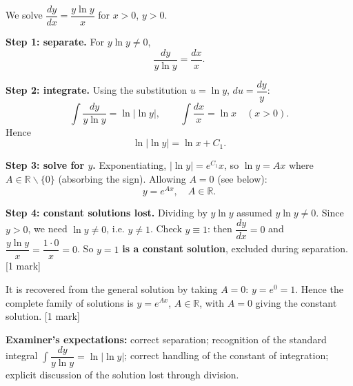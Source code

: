 \documentclass[11pt]{article}
\def\setminus{\mathbin{\backslash}}\let\smallsetminus\setminus
\begin{document}
\begin{corrige}
We solve $\dfrac{dy}{dx}=\dfrac{y\ln y}{x}$ for $x>0$, $y>0$.

\textbf{Step 1: separate.} For $y\ln y\neq 0$,
\[
\frac{dy}{y\ln y}=\frac{dx}{x}. \tag{1 mark}
\]

\textbf{Step 2: integrate.} Using the substitution $u=\ln y$, $du=\dfrac{dy}{y}$:
\[
\int\frac{dy}{y\ln y}=\ln|\ln y|,
\qquad
\int\frac{dx}{x}=\ln x \quad (x>0).
\]
Hence
\[
\ln|\ln y|=\ln x + C_{1}. \tag{2 marks}
\]

\textbf{Step 3: solve for $y$.} Exponentiating, $|\ln y|=e^{C_{1}}x$, so $\ln y = Ax$ where $A\in\mathbb{R}\setminus\{0\}$ (absorbing the sign). Allowing $A=0$ (see below):
\[
\boxed{\;y=e^{Ax},\quad A\in\mathbb{R}.\;} \tag{1 mark}
\]

\textbf{Step 4: constant solutions lost.} Dividing by $y\ln y$ assumed $y\ln y\neq 0$. Since $y>0$, we need $\ln y\neq 0$, i.e. $y\neq 1$. Check $y\equiv 1$: then $\dfrac{dy}{dx}=0$ and $\dfrac{y\ln y}{x}=\dfrac{1\cdot 0}{x}=0$. So $y=1$ \textbf{is a constant solution}, excluded during separation. \hfill[1 mark]

It is recovered from the general solution by taking $A=0$: $y=e^{0}=1$. Hence the complete family of solutions is $y=e^{Ax}$, $A\in\mathbb{R}$, with $A=0$ giving the constant solution. \hfill[1 mark]

\textbf{Examiner's expectations:} correct separation; recognition of the standard integral $\int\dfrac{dy}{y\ln y}=\ln|\ln y|$; correct handling of the constant of integration; explicit discussion of the solution lost through division.
\end{corrige}
\end{document}
